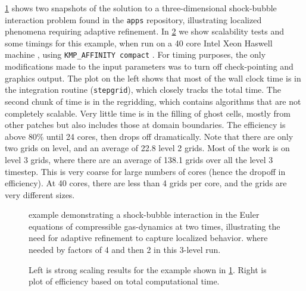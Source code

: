 \cref{fig:shockbubble} shows two snapshots of the solution to a
three-dimensional shock-bubble interaction problem found in the \clawpack
\texttt{apps} repository, illustrating localized phenomena requiring adaptive
refinement. In \cref{fig:amr_scaling} we show scalability tests and some timings
for this example, when run on a 40 core Intel Xeon Haswell machine
, using
\texttt{KMP\_AFFINITY compact} .
For timing purposes, the only modifications made to the input parameters was to
turn off check-pointing and graphics output. The plot on the left shows that most
of the wall clock time is in the integration routine (\texttt{stepgrid}), which
closely tracks the total time. The second chunk of time is in the regridding,
which contains algorithms that are not completely scalable. Very little time is
in the filling of ghost cells, mostly from other patches but also includes those
at domain boundaries. The efficiency is above 80\% until 24 cores, then drops
off dramatically. Note that there are only two grids on level, and an average of
22.8 level 2 grids. Most of the work is on level 3 grids, where there are an
average of 138.1 grids over all the level 3 timestep.  This is very coarse for
large numbers of cores (hence the dropoff in efficiency). At 40 cores, there are
less than 4 grids per core, and the grids are very different sizes.

\begin{figure}[t]
  \begin{center}
    \hfil
  \end{center}
\caption{\amrclaw example demonstrating a
  shock-bubble interaction in the Euler equations of compressible
  gas-dynamics at two times, illustrating the need for adaptive refinement
  to capture localized behavior.  where needed
  by factors of 4 and then 2 in this 3-level run.}
\label{fig:shockbubble}
\end{figure}

\begin{figure}[h]
  \begin{center}
    \hfil
  \end{center}
  \caption{Left is strong scaling results for the \amrclaw example shown in
    \cref{fig:shockbubble}.
    Right is plot of efficiency based on total computational time.}
  \label{fig:amr_scaling}
\end{figure}

